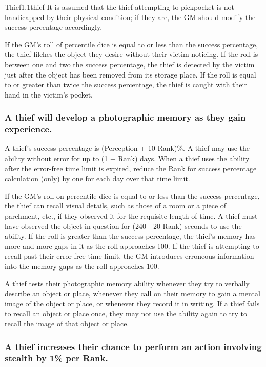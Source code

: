 \begin{skill}{Thief}{1.1}{thief}
It is assumed that the thief attempting to pickpocket is not
handicapped by their physical condition; if they are, the GM should
modify the success percentage accordingly.

If the GM's roll of percentile dice is equal to or less than the
success percentage, the thief filches the object they desire without
their victim noticing.  If the roll is between one and two the success
percentage, the thief is detected by the victim just after the object
has been removed from its storage place. If the roll is equal to or
greater than twice the success percentage, the thief is caught with
their hand in the victim's pocket.

\subsubsection{A thief will develop a photographic memory as they
gain experience.}

A thief's success percentage is (Perception + 10 \x Rank)\%.  A thief
may use the ability without error for up to (1 + Rank) days.  When a
thief uses the ability after the error-free time limit is expired,
reduce the Rank for success percentage calculation (only) by one for
each day over that time limit.

If the GM's roll on percentile dice is equal to or less than the
success percentage, the thief can recall visual details, such as those
of a room or a piece of parchment, etc., if they observed it for the
requisite length of time.  A thief must have observed the object in
question for (240 - 20 \x Rank) seconds to use the ability.  If the
roll is greater than the success percentage, the thief's memory has
more and more gaps in it as the roll approaches 100.  If the thief is
attempting to recall past their error-free time limit, the GM
introduces erroneous information into the memory gaps as the roll
approaches 100.

A thief tests their photographic memory ability whenever they try to
verbally describe an object or place, whenever they call on their
memory to gain a mental image of the object or place, or whenever they
record it in writing. If a thief fails to recall an object or place
once, they may not use the ability again to try to recall the image of
that object or place.

\subsubsection{A thief increases their chance to perform an action
involving stealth by 1\% per Rank.}


\end{skill}

